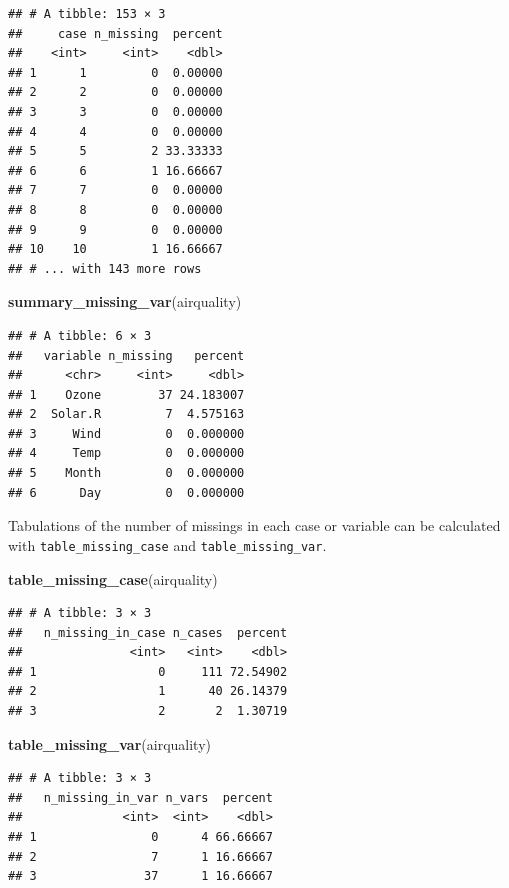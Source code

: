\documentclass[]{article}
\newenvironment{Shaded}{\begin{snugshade}}{\end{snugshade}}
\newcommand{\KeywordTok}[1]{\textcolor[rgb]{0.13,0.29,0.53}{\textbf{{#1}}}}
\newcommand{\NormalTok}[1]{{#1}}
\begin{document}
\begin{verbatim}
## # A tibble: 153 × 3
##     case n_missing  percent
##    <int>     <int>    <dbl>
## 1      1         0  0.00000
## 2      2         0  0.00000
## 3      3         0  0.00000
## 4      4         0  0.00000
## 5      5         2 33.33333
## 6      6         1 16.66667
## 7      7         0  0.00000
## 8      8         0  0.00000
## 9      9         0  0.00000
## 10    10         1 16.66667
## # ... with 143 more rows
\end{verbatim}

\begin{Shaded}
\begin{Highlighting}[]
\KeywordTok{summary_missing_var}\NormalTok{(airquality)}
\end{Highlighting}
\end{Shaded}

\begin{verbatim}
## # A tibble: 6 × 3
##   variable n_missing   percent
##      <chr>     <int>     <dbl>
## 1    Ozone        37 24.183007
## 2  Solar.R         7  4.575163
## 3     Wind         0  0.000000
## 4     Temp         0  0.000000
## 5    Month         0  0.000000
## 6      Day         0  0.000000
\end{verbatim}

Tabulations of the number of missings in each case or variable can be
calculated with \texttt{table\_missing\_case} and
\texttt{table\_missing\_var}.

\begin{Shaded}
\begin{Highlighting}[]
\KeywordTok{table_missing_case}\NormalTok{(airquality)}
\end{Highlighting}
\end{Shaded}

\begin{verbatim}
## # A tibble: 3 × 3
##   n_missing_in_case n_cases  percent
##               <int>   <int>    <dbl>
## 1                 0     111 72.54902
## 2                 1      40 26.14379
## 3                 2       2  1.30719
\end{verbatim}

\begin{Shaded}
\begin{Highlighting}[]
\KeywordTok{table_missing_var}\NormalTok{(airquality)}
\end{Highlighting}
\end{Shaded}

\begin{verbatim}
## # A tibble: 3 × 3
##   n_missing_in_var n_vars  percent
##              <int>  <int>    <dbl>
## 1                0      4 66.66667
## 2                7      1 16.66667
## 3               37      1 16.66667
\end{verbatim}
\end{document}
